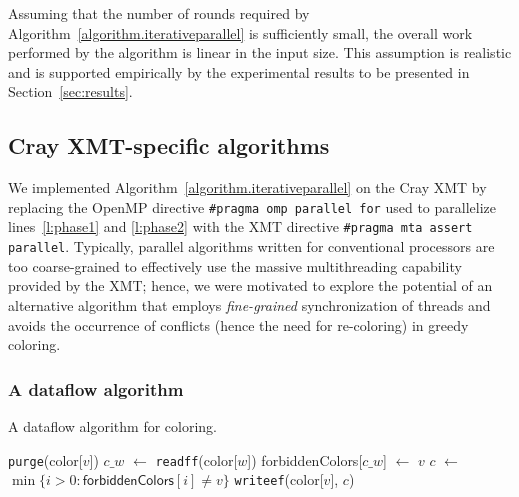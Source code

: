\documentclass{article}
\begin{document}
Assuming that the number of rounds required by Algorithm~\ref{algorithm.iterativeparallel} is
sufficiently small, the overall work performed by the algorithm is linear in the input size.
This assumption is realistic and is supported empirically by the experimental results  
to be presented in Section~\ref{sec:results}.


\subsection{Cray XMT-specific algorithms}
\label{sec:dataflow}

We implemented Algorithm~\ref{algorithm.iterativeparallel} on the Cray XMT by replacing  the
OpenMP directive  \texttt{\#pragma omp parallel for} used to parallelize lines~\ref{l:phase1}  and \ref{l:phase2} 
with the XMT directive \texttt{\#pragma mta assert parallel}.
Typically, parallel algorithms written for conventional processors are too coarse-grained 
to effectively use the massive multithreading capability provided by the XMT; 
hence, we were motivated to explore the potential of an alternative algorithm that employs {\em fine-grained}
synchronization of threads and avoids the occurrence of conflicts (hence the need for re-coloring)
in greedy coloring.

\subsubsection{A dataflow algorithm}

\begin{algorithm}[t]
\small
\caption{A dataflow algorithm for coloring.} 
\label{algorithm.dataflow.coloring}
\begin{algorithmic}[1]
   \label{l:purge}
      \State \texttt{purge}(\textsf{color}[$v$]) 
  \EndFor
   \label{l:dcolor}
              \State $c\_w$ $\leftarrow$ \texttt{readff}(\textsf{color}[$w$])       
               \label{dataflow:readff-line}
             \State \textsf{forbiddenColors}[$c\_w$] $\leftarrow$ $v$ 
      \EndFor
      \State $c$  $\leftarrow$ $\min\{i>0: \textsf{forbiddenColors}[i] \neq v\}$  
      \State \texttt{writeef}(\textsf{color}[$v$], $c$) 
  \EndFor
\EndProcedure
\end{algorithmic}
\end{algorithm}
\end{document}
